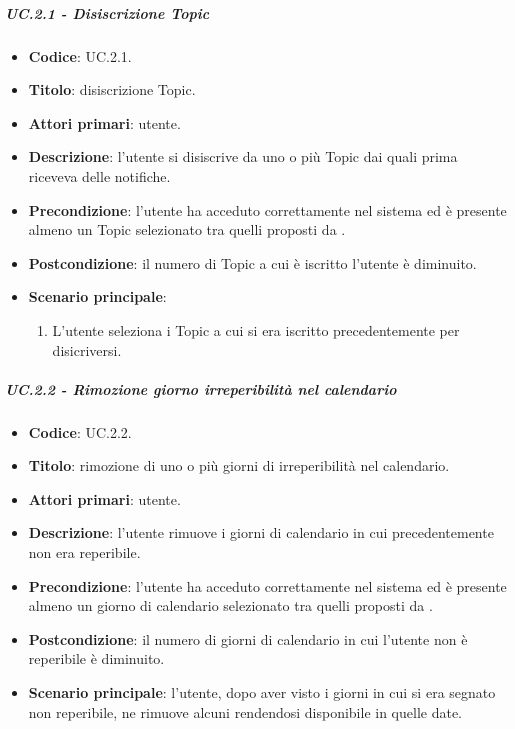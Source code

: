 	
	\subparagraph{UC\theuccount.2.1 - Disiscrizione Topic}
	\begin{itemize}
		\item \textbf{Codice}: UC\theuccount.2.1.
		\item \textbf{Titolo}: disiscrizione Topic.
		\item \textbf{Attori primari}: utente.
		\item \textbf{Descrizione}: l'utente si disiscrive da uno o più Topic dai quali prima riceveva delle notifiche.
		\item \textbf{Precondizione}: l'utente ha acceduto correttamente nel sistema ed è presente almeno un Topic selezionato tra quelli proposti da \progetto.
		\item \textbf{Postcondizione}: il numero di Topic a cui è iscritto l'utente è diminuito.
		\item \textbf{Scenario principale}:
		\begin{enumerate}
			\item L'utente seleziona i Topic a cui si era iscritto precedentemente per disicriversi.
		\end{enumerate}
	\end{itemize}
	
			
	\subparagraph{UC\theuccount.2.2 - Rimozione giorno irreperibilità nel calendario}
	\begin{itemize}
		\item \textbf{Codice}: UC\theuccount.2.2.
		\item \textbf{Titolo}: rimozione di uno o più giorni  di irreperibilità nel calendario.
		\item \textbf{Attori primari}: utente.
		\item \textbf{Descrizione}: l'utente rimuove i giorni di calendario in cui precedentemente non era reperibile.
		\item \textbf{Precondizione}: l'utente ha acceduto correttamente nel sistema ed è presente almeno un giorno di calendario selezionato tra quelli proposti da \progetto.
		\item \textbf{Postcondizione}: il numero di giorni di calendario in cui l'utente non è reperibile è diminuito.
		\item \textbf{Scenario principale}: l'utente, dopo aver visto i giorni in cui si era segnato non reperibile, ne rimuove alcuni rendendosi disponibile in quelle date.
	\end{itemize}
			

